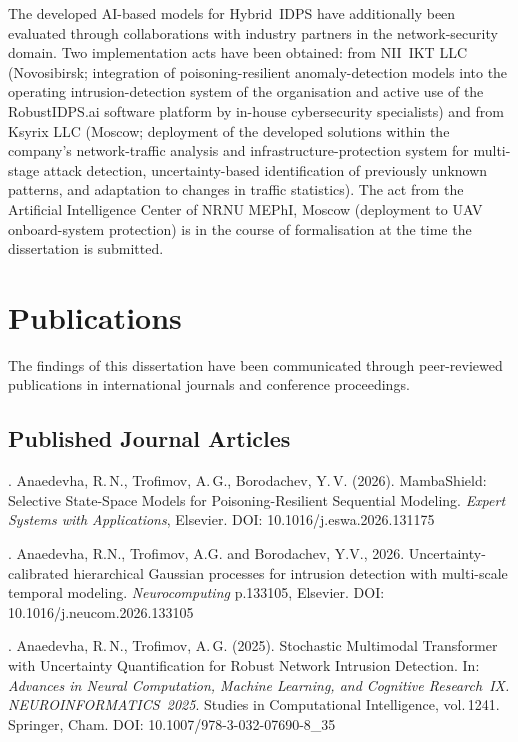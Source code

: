 The developed AI-based models for Hybrid~IDPS have additionally been evaluated through collaborations with industry partners in the network-security domain. Two implementation acts have been obtained: from NII~IKT LLC (Novosibirsk; integration of poisoning-resilient anomaly-detection models into the operating intrusion-detection system of the organisation and active use of the RobustIDPS.ai software platform by in-house cybersecurity specialists) and from Ksyrix LLC (Moscow; deployment of the developed solutions within the company's network-traffic analysis and infrastructure-protection system for multi-stage attack detection, uncertainty-based identification of previously unknown patterns, and adaptation to changes in traffic statistics). The act from the Artificial Intelligence Center of NRNU MEPhI, Moscow (deployment to UAV onboard-system protection) is in the course of formalisation at the time the dissertation is submitted.

\section*{Publications}

The findings of this dissertation have been communicated through peer-reviewed publications in international journals and conference proceedings.

\subsection*{Published Journal Articles}

. Anaedevha, R.\,N., Trofimov, A.\,G., Borodachev, Y.\,V. (2026). MambaShield: Selective State-Space Models for Poisoning-Resilient Sequential Modeling. \textit{Expert Systems with Applications}, Elsevier. DOI: 10.1016/j.eswa.2026.131175

. Anaedevha, R.N., Trofimov, A.G. and Borodachev, Y.V., 2026. Uncertainty-calibrated hierarchical Gaussian processes for intrusion detection with multi-scale temporal modeling. \textit{Neurocomputing} p.133105, Elsevier. DOI: 10.1016/j.neucom.2026.133105

. Anaedevha, R.\,N., Trofimov, A.\,G. (2025). Stochastic Multimodal Transformer with Uncertainty Quantification for Robust Network Intrusion Detection. In: \textit{Advances in Neural Computation, Machine Learning, and Cognitive Research~IX. NEUROINFORMATICS~2025}. Studies in Computational Intelligence, vol.\,1241. Springer, Cham. DOI: 10.1007/978-3-032-07690-8\_35

